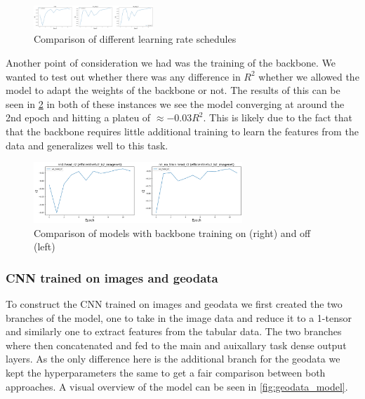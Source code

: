 \documentclass[12pt,a4paper,oneside]{article}
\begin{document}
\begin{figure}[!h]
    \centering
    \includegraphics[width=0.4\textwidth]{assets/lr_schedule_diffs.png}
    \caption{Comparison of different learning rate schedules}
    \label{fig:lr_schedules}
\end{figure}


Another point of consideration we had was the training of the backbone. We wanted to test out whether there was any difference in $R^2$ whether we allowed the model to adapt the weights of the backbone or not. The results of this can be seen in \ref{fig:backbone_training} in both of these instances we see the model converging at around the 2nd epoch and hitting a plateu of $\approx -0.03 R^2$. This is likely due to the fact that that the backbone requires little additional training to learn the features from the data and generalizes well to this task.


\begin{figure}[!h]
    \centering
    \includegraphics[width=0.7\textwidth]{assets/train_vs_notrain.png}
    \caption{Comparison of models with backbone training on (right) and off (left)}
    \label{fig:backbone_training}
\end{figure}

\subsubsection{CNN trained on images and geodata}

To construct the CNN trained on images and geodata we first created the two branches of the model, one to take in the image data and reduce it to a 1-tensor and similarly one to extract features from the tabular data. The two branches where then concatenated and fed to the main and auixallary task dense output layers. As the only difference here is the additional branch for the geodata we kept the hyperparameters the same to get a fair comparison between both approaches. A visual overview of the model can be seen in \ref{fig:geodata_model}.
\end{document}

